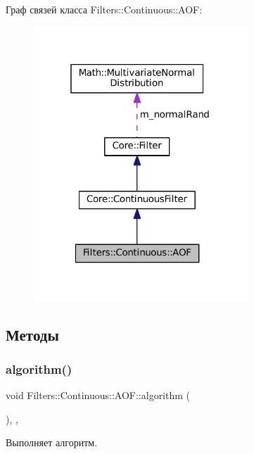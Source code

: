 Граф связей класса Filters\+:\+:Continuous\+:\+:A\+OF\+:
\nopagebreak
\begin{figure}[H]
\begin{center}
\leavevmode
\includegraphics[width=229pt]{class_filters_1_1_continuous_1_1_a_o_f__coll__graph}
\end{center}
\end{figure}


\subsection{Методы}
\hypertarget{class_filters_1_1_continuous_1_1_a_o_f_af25cf723db57bba9d52173b27f960170}{}\label{class_filters_1_1_continuous_1_1_a_o_f_af25cf723db57bba9d52173b27f960170} 
\subsubsection{\texorpdfstring{algorithm()}{algorithm()}}
{\footnotesize\ttfamily void Filters\+::\+Continuous\+::\+A\+O\+F\+::algorithm (\begin{DoxyParamCaption}{ }\end{DoxyParamCaption})\hspace{0.3cm}{\ttfamily [override]}, {\ttfamily [protected]}, {\ttfamily [virtual]}}



Выполняет алгоритм. 

